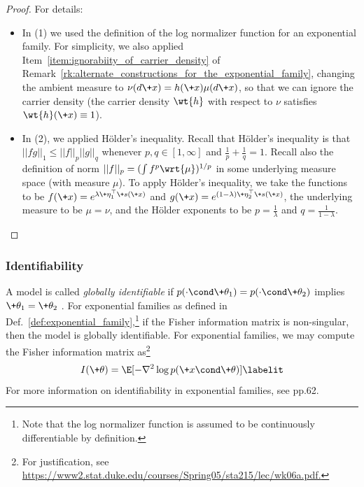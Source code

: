 \documentclass{article} %
\newcommand{\obs}{\+x}
\newcommand{\sufficientStatsFunction}{\+s}
\newcommand{\carrierDensity}{h}
\newcommand{\param}{\+\theta}
\newcommand{\naturalParam}{\+\eta}
\begin{document}
\begin{proof}
For details:
\begin{itemize}
	\item In (1) we used the definition of the log normalizer function for an exponential family. For simplicity, we also applied Item~\ref{item:ignorabiity_of_carrier_density} of Remark~\ref{rk:alternate_constructions_for_the_exponential_family}, changing the ambient measure to $\nu(d\obs) = h(\obs) \mu(d\obs)$, so that we can ignore the carrier density (the carrier density $\wt{\carrierDensity}$ with respect to $\nu$ satisfies $\wt{\carrierDensity}(\obs) \equiv 1$).
	\item In (2), we applied H\"{o}lder’s inequality.  Recall that H\"{o}lder’s inequality is that $||fg||_1 \leq ||f||_p ||g||_q$ whenever $p,q \in [1,\infty]$ and $\frac{1}{p} + \frac{1}{q}=1$.  Recall also the definition of norm $||f||_p = (\int f^p \wrt{\mu})^{1/p}$ in some underlying measure space (with measure $\mu$).  To apply H\"{o}lder’s inequality, we take the functions to be $f(\obs) = e^{\lambda \naturalParam_1^\top \sufficientStatsFunction(\obs)}$ and $g(\obs) = e^{(1-\lambda)\naturalParam_2^\top \sufficientStatsFunction(\obs)}$, the underlying measure to be $\mu=\nu$, and the H\"{o}lder exponents to be $p=\frac{1}{\lambda}$ and $q=\frac{1}{1-\lambda}$. 
\end{itemize} 
\end{proof}


\subsubsection{Identifiability}

A model is called \textit{globally identifiable} if $p(\cdot \cond \param_1) = p(\cdot \cond \param_2)$ implies $\param_1=\param_2$ \cite{cole2020parameter}. For exponential families as defined in Def.~\ref{def:exponential_family},\footnote{Note that the log normalizer function is assumed to be continuously differentiable by definition.} if the Fisher information matrix is non-singular, then the model is globally identifiable.  For exponential families, we may compute the Fisher information matrix as\footnote{For justification, see \url{https://www2.stat.duke.edu/courses/Spring05/sta215/lec/wk06a.pdf.}}
\begin{align*}
I(\param) = \E [ -\nabla^2 \log p(\obs \cond \param)]
\labelit \label{eqn:fisher_information_matrix_for_exponential_families}	
\end{align*}
For more information on identifiability in exponential families, see \cite{cole2020parameter} pp.62. 
\end{document}
